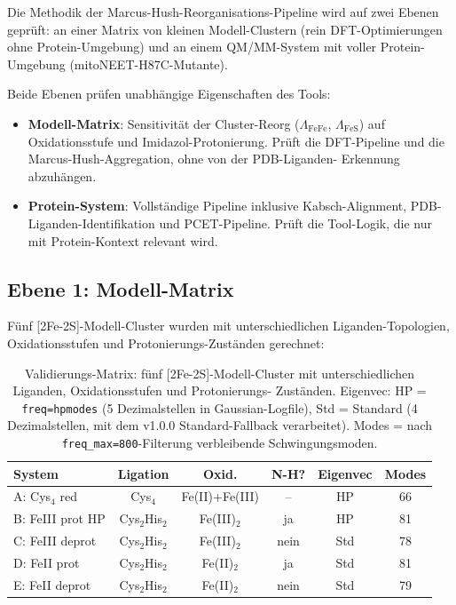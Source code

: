 \documentclass[11pt,a4paper,twoside]{article}
\theoremstyle{remark}
\begin{document}
Die Methodik der Marcus-Hush-Reorganisations-Pipeline wird auf zwei
Ebenen gepr\"uft: an einer Matrix von kleinen Modell-Clustern (rein
DFT-Optimierungen ohne Protein-Umgebung) und an einem
QM/MM-System mit voller Protein-Umgebung (mitoNEET-H87C-Mutante).

Beide Ebenen pr\"ufen unabh\"angige Eigenschaften des Tools:

\begin{itemize}
  \item \textbf{Modell-Matrix}: Sensitivit\"at der Cluster-Reorg
        ($\Lambda_\text{FeFe}$, $\Lambda_\text{FeS}$) auf Oxidationsstufe und
        Imidazol-Protonierung. Pr\"uft die DFT-Pipeline und die
        Marcus-Hush-Aggregation, ohne von der PDB-Liganden-
        Erkennung abzuh\"angen.
  \item \textbf{Protein-System}: Vollst\"andige Pipeline inklusive
        Kabsch-Alignment, PDB-Liganden-Identifikation und
        PCET-Pipeline. Pr\"uft die Tool-Logik, die nur mit
        Protein-Kontext relevant wird.
\end{itemize}

\subsection{Ebene 1: Modell-Matrix}
\label{sec:val-modell-matrix}

F\"unf [2Fe-2S]-Modell-Cluster wurden mit unterschiedlichen
Liganden-Topologien, Oxidationsstufen und Protonierungs-Zust\"anden
gerechnet:

\begin{table}[h]
\centering
\small
\begin{tabular}{|l|c|c|c|c|c|}
\hline
\textbf{System} & \textbf{Ligation} & \textbf{Oxid.} &
  \textbf{N-H?} & \textbf{Eigenvec} & \textbf{Modes} \\
\hline
A: Cys$_4$ red       & Cys$_4$    & Fe(II)+Fe(III) & --   & HP   & 66 \\
B: FeIII prot HP   & Cys$_2$His$_2$ & Fe(III)$_2$    & ja   & HP   & 81 \\
C: FeIII deprot      & Cys$_2$His$_2$ & Fe(III)$_2$    & nein & Std  & 78 \\
D: FeII prot         & Cys$_2$His$_2$ & Fe(II)$_2$     & ja   & Std  & 81 \\
E: FeII deprot       & Cys$_2$His$_2$ & Fe(II)$_2$     & nein & Std  & 79 \\
\hline
\end{tabular}
\caption{Validierungs-Matrix: f\"unf [2Fe-2S]-Modell-Cluster mit
unterschiedlichen Liganden, Oxidationsstufen und Protonierungs-
Zust\"anden. Eigenvec: HP = \texttt{freq=hpmodes} (5 Dezimalstellen
in Gaussian-Logfile), Std = Standard (4 Dezimalstellen, mit dem
v1.0.0 Standard-Fallback verarbeitet). Modes = nach
\texttt{freq\_max=800}-Filterung verbleibende Schwingungsmoden.}
\label{tab:validierung-matrix}
\end{table}
\end{document}
